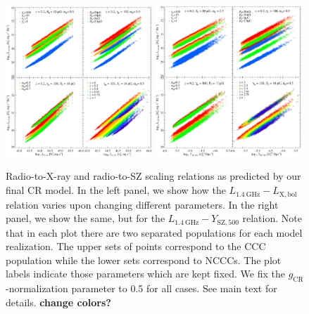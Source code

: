 \documentclass[traditabstract]{aa}
\newcommand{\rmn}{\mathrm}
\begin{document}
\begin{figure}[t]
\centering
\includegraphics[width=0.49\textwidth]{figures/PL_relation_testing_gimp.eps}
\includegraphics[width=0.49\textwidth]{figures/PSZ_relation_testing_gimp.eps}
\caption{Radio-to-X-ray and radio-to-SZ scaling relations as predicted by our
  final CR model. In the left panel, we show how the
  $L_{1.4~\rmn{GHz}}-L_{\rmn{X,bol}}$ relation varies upon changing different
  parameters. In the right panel, we show the same, but for the
  $L_{1.4~\rmn{GHz}}-Y_{\rmn{SZ},500}$ relation. Note that in each plot there
  are two separated populations for each model realization. The upper sets of
  points correspond to the CCC population while the lower sets correspond to
  NCCCs. The plot labels indicate those parameters which are kept
  fixed. We fix the $g_{\rmn{CR}}$-normalization parameter to 0.5 for all
  cases. See main text for details. {\bf change colors?}}
\label{fig:SR}
\end{figure}
\end{document}
